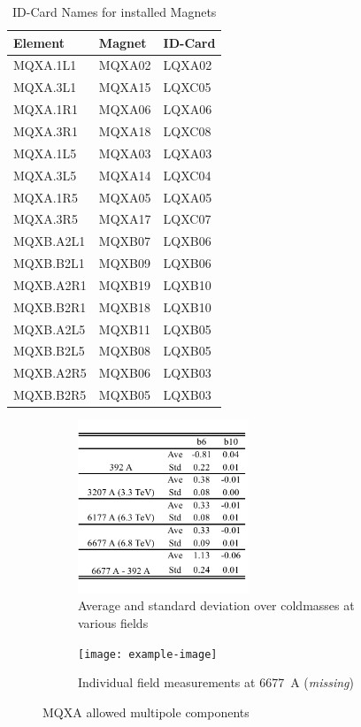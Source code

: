 \begin{table}[h!]
    \caption[]{ID-Card Names for installed Magnets}
    \label{tab:MagnetNamesToIDCards}
    \centering
    \begin{tabular}{lll}
        \bf Element & \bf Magnet & \bf ID-Card \\
        \toprule
        MQXA.1L1 & MQXA02 & LQXA02 \\ 
        MQXA.3L1 & MQXA15 & LQXC05 \\ 
        MQXA.1R1 & MQXA06 & LQXA06 \\ 
        MQXA.3R1 & MQXA18 & LQXC08 \\ 
        MQXA.1L5 & MQXA03 & LQXA03 \\ 
        MQXA.3L5 & MQXA14 & LQXC04 \\ 
        MQXA.1R5 & MQXA05 & LQXA05 \\ 
        MQXA.3R5 & MQXA17 & LQXC07 \\ 
        \midrule
        MQXB.A2L1 & MQXB07 & LQXB06 \\ 
        MQXB.B2L1 & MQXB09 & LQXB06 \\ 
        MQXB.A2R1 & MQXB19 & LQXB10 \\ 
        MQXB.B2R1 & MQXB18 & LQXB10 \\ 
        MQXB.A2L5 & MQXB11 & LQXB05 \\ 
        MQXB.B2L5 & MQXB08 & LQXB05 \\ 
        MQXB.A2R5 & MQXB06 & LQXB03 \\ 
        MQXB.B2R5 & MQXB05 & LQXB03 \\ 
        \bottomrule
    \end{tabular}
\end{table}


\begin{figure}[h!]
    \centering
    \begin{subfigure}{.45\textwidth}
        \includegraphics[width=5.11cm]{images/mqxa_b6_summary.pdf}
        \caption{Average and standard deviation over coldmasses at various fields}
    \end{subfigure}
    \begin{subfigure}{.45\textwidth}
        \texttt{[image: example-image]}
        \caption{Individual field measurements at \SI{6677}{\ampere} (\textit{missing})}
    \end{subfigure}
    \caption{MQXA allowed multipole components}
    \label{fig:MQXAb6Summary}
\end{figure}


